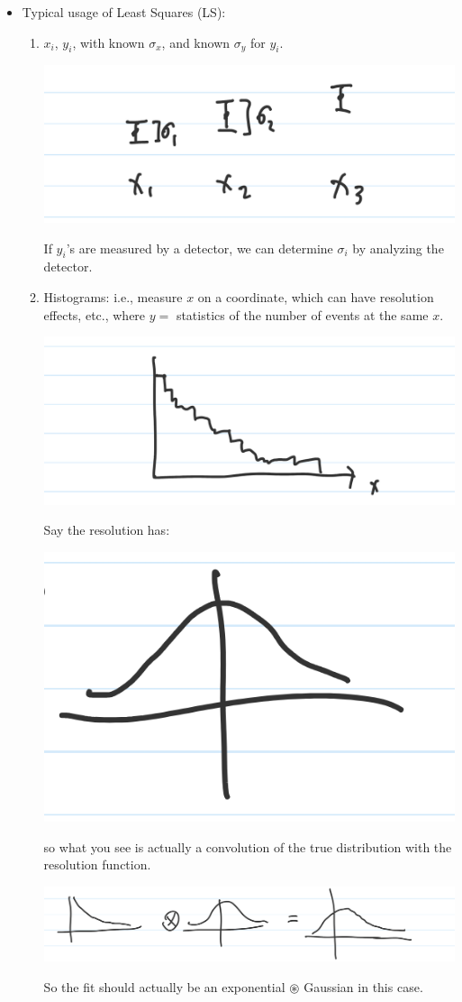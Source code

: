 \begin{itemize}
    \item Typical usage of Least Squares (LS):
          \begin{enumerate}
              \item $x_i$, $y_i$, with known $\sigma_x$, and known $\sigma_y$ for $y_i$.

                    \includegraphics[width=0.4\linewidth]{Images/lec11-points.png}

                    If $y_i$'s are measured by a detector, we can determine $\sigma_i$ by analyzing the detector.
              \item Histograms: i.e., measure $x$ on a coordinate, which can have resolution effects, etc., where $y =$ statistics of the number of events at the same $x$.

                    \includegraphics[width=0.4\linewidth]{Images/lec11-histogram.png}

                    Say the resolution has:

                    \includegraphics[width=0.4\linewidth]{Images/lec11-resolution.png}

                    so what you see is actually a convolution of the true distribution with the resolution function.

                    \includegraphics[width=0.4\linewidth]{Images/lec11-convolution.png}

                    So the fit should actually be an exponential $\circledast$ Gaussian in this case.


\end{enumerate}
\end{itemize}

